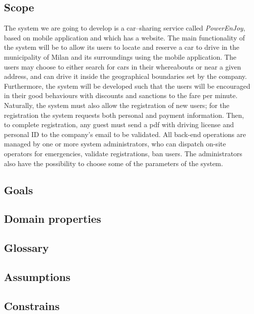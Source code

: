 \documentclass{article}
\begin{document}
		\subsection{Scope}
			The system we are going to develop is a car–sharing service called \textit{PowerEnJoy}, based on mobile application and which has a website. 
			The main functionality of the system will be to allow its users to locate and reserve a car to drive in the municipality of Milan and its surroundings using the mobile application. The users may choose to either search for cars in their whereabouts or near a given address, and can drive it inside the geographical boundaries set by the company. 
			Furthermore, the system will be developed such that the users will be encouraged in their good behaviours with discounts and sanctions to the fare per minute.
			Naturally, the system must also allow the registration of new users; for the registration the system requests both personal and payment information. Then, to complete registration, any guest must send a pdf with driving license and personal ID to the company's email to be validated. 
			All back-end operations are managed by one or more system administrators, who can dispatch on-site operators for emergencies, validate registrations, ban users. The administrators also have the possibility to choose some of the parameters of the system. 
			
			
		\subsection{Goals}
		

		\subsection{Domain properties}
		

		\subsection{Glossary}
		

		\subsection{Assumptions}
		

		\subsection{Constrains}
\end{document}
